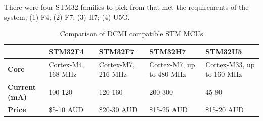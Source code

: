 There were four STM32 families to pick from that met the requirements of the system; (1) F4; (2) F7; (3) H7; (4) U5G.

\begin{table}[H]
    \centering
    \begin{tabular}{|l|p{2.5cm}|p{2.5cm}|p{2.5cm}|p{2.5cm}|}
    \hline
    \textbf{} & \textbf{STM32F4} & \textbf{STM32F7} & \textbf{STM32H7} & \textbf{STM32U5} \\
    \hline
    \textbf{Core} & Cortex-M4, 168 MHz & Cortex-M7, 216 MHz & Cortex-M7, up to 480 MHz & Cortex-M33, up to 160 MHz \\
    \hline
    \textbf{Current (mA)} & 100-120 & 120-160 & 200-300 & 45-80 \\
    \hline
    \textbf{Price} & \$5-10 AUD & \$20-30 AUD & \$15-25 AUD & \$15-20 AUD \\
    \hline
    \end{tabular}
    \caption{Comparison of DCMI compatible STM MCUs}
    \label{tab:stm32-dcmi-breakdown}
\end{table}

